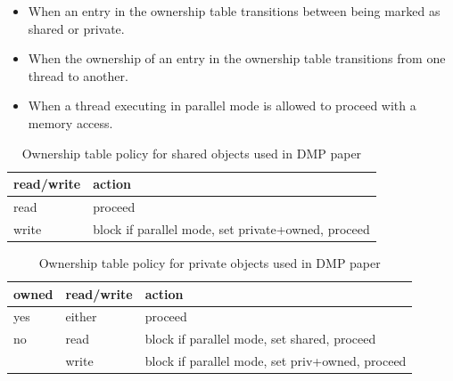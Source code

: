 \begin{itemize}
\item When an entry in the ownership table transitions between being
  marked as shared or private.

\item When the ownership of an entry in the ownership table
  transitions from one thread to another.

\item When a thread executing in parallel mode is allowed to proceed
  with a memory access.
\end{itemize}

\begin{table}
  \begin{tabular}{l|l}
    read/write &  action                                             \\
    \hline
    read       &  proceed                                            \\
    write      &  block if parallel mode, set private+owned, proceed \\
  \end{tabular}
  \caption{Ownership table policy for shared objects used in DMP paper}
  \label{table:ownership-policy-shared}
\end{table}

\begin{table}
  \begin{tabular}{l|l|l}
    owned & read/write &  action                                          \\
    \hline       
    yes   &  either    &  proceed                                         \\
    no    &  read      &  block if parallel mode, set shared, proceed     \\
          &  write     &  block if parallel mode, set priv+owned, proceed \\
  \end{tabular}
  \caption{Ownership table policy for private objects used in DMP paper}
  \label{table:ownership-policy-private}
\end{table}

